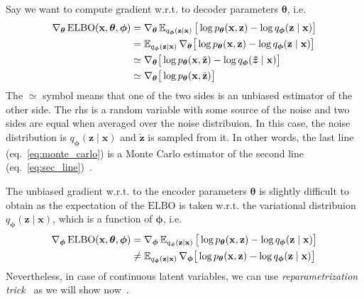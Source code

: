 Say we want to compute gradient w.r.t. to decoder parameters ${\boldsymbol{\theta}}$, i.e. 
\begin{align}
    \nabla_{{\boldsymbol{\theta}}}\,\mathrm{ELBO}(\mathbf{x},{\boldsymbol{\theta}},{\boldsymbol{\phi}}) &= \nabla_{{\boldsymbol{\theta}}} \operatorname{\mathbb{E}}_{q_{\boldsymbol{\phi}}(\mathbf{z}\mid\mathbf{x})} \big[\log p_{\boldsymbol{\theta}}(\mathbf{x},\mathbf{z}) - \log q_{\boldsymbol{\phi}}(\mathbf{z}\mid\mathbf{x})\big] \notag \\
        &= \operatorname{\mathbb{E}}_{q_{\boldsymbol{\phi}}(\mathbf{z}\mid\mathbf{x})} \nabla_{{\boldsymbol{\theta}}} \big[\log p_{\boldsymbol{\theta}}(\mathbf{x},\mathbf{z}) - \log q_{\boldsymbol{\phi}}(\mathbf{z}\mid\mathbf{x})\big] \label{eq:sec_line} \\
        &\simeq  \nabla_{{\boldsymbol{\theta}}} \big[\log p_{\boldsymbol{\theta}}(\mathbf{x},\tilde{\mathbf{z}}) - \log q_{\boldsymbol{\phi}}(\boldsymbol{\tilde{z}}\mid\mathbf{x})\big] \notag\\
        &\simeq \nabla_{{\boldsymbol{\theta}}} \big[\log p_{\boldsymbol{\theta}}(\mathbf{x},\tilde{\mathbf{z}})\big] \label{eq:monte_carlo}
\end{align}
The $\simeq$ symbol means that one of the two sides is an unbiased estimator of the other side. The rhs is a random variable with some source of the noise and two sides are equal
when averaged over the noise distribuion. In this case, the noise distribution is $q_{\boldsymbol{\phi}}(\mathbf{z}\mid \mathbf{x})$ and $\tilde{\mathbf{z}}$ is sampled from it. In other words, the last 
line (eq.~\ref{eq:monte_carlo}) is a Monte Carlo estimator of the second line (eq.~\ref{eq:sec_line})~\cite{intro-vae-2019}.

The unbiased gradient w.r.t. to the encoder parameters ${\boldsymbol{\theta}}$ is slightly difficult to obtain as the expectation of the $\mathrm{ELBO}$ is taken w.r.t. the variational distribuion 
$q_{\boldsymbol{\phi}}(\mathbf{z}\mid \mathbf{x})$, which is a function of ${\boldsymbol{\phi}}$, i.e.
\begin{align}
    \nabla_{{\boldsymbol{\phi}}}\,\mathrm{ELBO}(\mathbf{x},{\boldsymbol{\theta}},{\boldsymbol{\phi}}) &= \nabla_{{\boldsymbol{\phi}}} \operatorname{\mathbb{E}}_{q_{\boldsymbol{\phi}}(\mathbf{z}\mid \mathbf{x})} \big[\log p_{\boldsymbol{\theta}}(\mathbf{x},\mathbf{z}) - \log q_{\boldsymbol{\phi}}(\mathbf{z}\mid \mathbf{x})\big] \\
                                                         &\neq  \operatorname{\mathbb{E}}_{q_{\boldsymbol{\phi}}(\mathbf{z}\mid \mathbf{x})} \nabla_{{\boldsymbol{\phi}}} \big[\log p_{\boldsymbol{\theta}}(\mathbf{x},\mathbf{z}) - \log q_{\boldsymbol{\phi}}(\mathbf{z}\mid \mathbf{x})\big]
\end{align}
Nevertheless, in case of continuous latent variables, we can use \textit{reparametrization trick}~\cite{renedze-backprop-2014} as we will show now~\cite{intro-vae-2019}.

